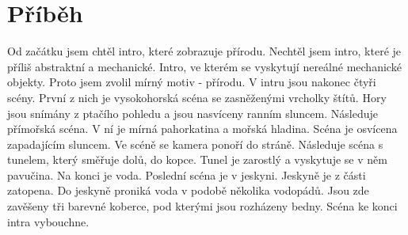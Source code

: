 \section{Příběh}
Od začátku jsem chtěl intro, které zobrazuje přírodu.
Nechtěl jsem intro, které je příliš abstraktní a mechanické.
Intro, ve kterém se vyskytují nereálné mechanické objekty.
Proto jsem zvolil mírný motiv - přírodu.
V intru jsou nakonec čtyři scény.
První z nich je vysokohorská scéna se zasněženými vrcholky štítů.
Hory jsou snímány z ptačího pohledu a jsou nasvíceny ranním sluncem.
Následuje přímořská scéna.
V ní je mírná pahorkatina a mořská hladina.
Scéna je osvícena zapadajícím sluncem.
Ve scéně se kamera ponoří do stráně.
Následuje scéna s tunelem, který směřuje dolů, do kopce.
Tunel je zarostlý a vyskytuje se v něm pavučina.
Na konci je voda.
Poslední scéna je v jeskyni.
Jeskyně je z části zatopena.
Do jeskyně proniká voda v podobě několika vodopádů.
Jsou zde zavěšeny tři barevné koberce, pod kterými jsou rozházeny bedny.
Scéna ke konci intra vybouchne.


